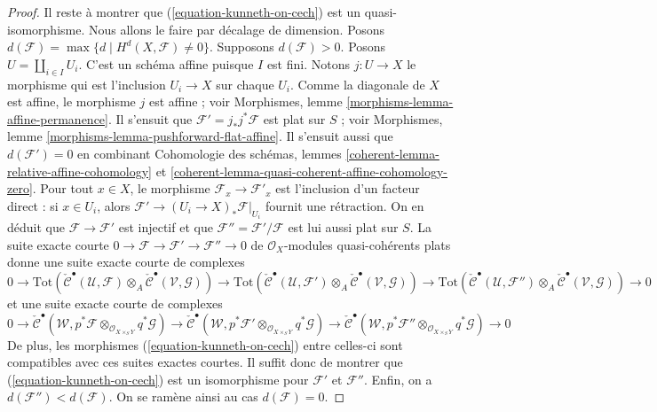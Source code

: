 \begin{proof}
\medskip\noindent
Il reste à montrer que (\ref{equation-kunneth-on-cech})
est un quasi-isomorphisme. Nous allons le faire par décalage de dimension.
Posons $d(\mathcal{F}) = \max \{d \mid H^d(X, \mathcal{F}) \not = 0\}$.
Supposons $d(\mathcal{F}) > 0$. Posons $U = \coprod\nolimits_{i \in I} U_i$.
C'est un schéma affine puisque $I$ est fini. Notons
$j : U \to X$ le morphisme qui est l'inclusion $U_i \to X$
sur chaque $U_i$. Comme la diagonale de $X$ est affine, le morphisme
$j$ est affine ; voir
Morphismes, lemme \ref{morphisms-lemma-affine-permanence}.
Il s'ensuit que $\mathcal{F}' = j_*j^*\mathcal{F}$ est plat sur $S$ ; voir
Morphismes, lemme \ref{morphisms-lemma-pushforward-flat-affine}.
Il s'ensuit aussi que $d(\mathcal{F}') = 0$ en combinant
Cohomologie des schémas, lemmes
\ref{coherent-lemma-relative-affine-cohomology} et
\ref{coherent-lemma-quasi-coherent-affine-cohomology-zero}.
Pour tout $x \in X$, le morphisme $\mathcal{F}_x  \to \mathcal{F}'_x$
est l'inclusion d'un facteur direct : si $x \in U_i$,
alors $\mathcal{F}' \to (U_i \to X)_*\mathcal{F}|_{U_i}$
fournit une rétraction. On en déduit que
$\mathcal{F} \to \mathcal{F}'$ est injectif et que
$\mathcal{F}'' = \mathcal{F}'/\mathcal{F}$
est lui aussi plat sur $S$. La suite exacte courte
$0 \to \mathcal{F} \to \mathcal{F}' \to \mathcal{F}'' \to 0$
de $\mathcal{O}_X$-modules quasi-cohérents plats
donne une suite exacte courte de complexes
$$
0 \to
\text{Tot}(
\check{\mathcal{C}}^\bullet(\mathcal{U}, \mathcal{F})
\otimes_A
\check{\mathcal{C}}^\bullet(\mathcal{V}, \mathcal{G})) \to
\text{Tot}(
\check{\mathcal{C}}^\bullet(\mathcal{U}, \mathcal{F}')
\otimes_A
\check{\mathcal{C}}^\bullet(\mathcal{V}, \mathcal{G})) \to
\text{Tot}(
\check{\mathcal{C}}^\bullet(\mathcal{U}, \mathcal{F}'')
\otimes_A
\check{\mathcal{C}}^\bullet(\mathcal{V}, \mathcal{G})) \to 0
$$
et une suite exacte courte de complexes
$$
0 \to
\check{\mathcal{C}}^\bullet(\mathcal{W},
p^*\mathcal{F}
\otimes_{\mathcal{O}_{X \times_S Y}}
q^*\mathcal{G}) \to
\check{\mathcal{C}}^\bullet(\mathcal{W},
p^*\mathcal{F}'
\otimes_{\mathcal{O}_{X \times_S Y}}
q^*\mathcal{G}) \to
\check{\mathcal{C}}^\bullet(\mathcal{W},
p^*\mathcal{F}''
\otimes_{\mathcal{O}_{X \times_S Y}}
q^*\mathcal{G}) \to 0
$$
De plus, les morphismes (\ref{equation-kunneth-on-cech}) entre celles-ci
sont compatibles avec ces suites exactes courtes. Il suffit donc de montrer que
(\ref{equation-kunneth-on-cech})
est un isomorphisme pour $\mathcal{F}'$ et $\mathcal{F}''$. Enfin,
on a $d(\mathcal{F}'') < d(\mathcal{F})$.
On se ramène ainsi au cas $d(\mathcal{F}) = 0$.


\end{proof}
